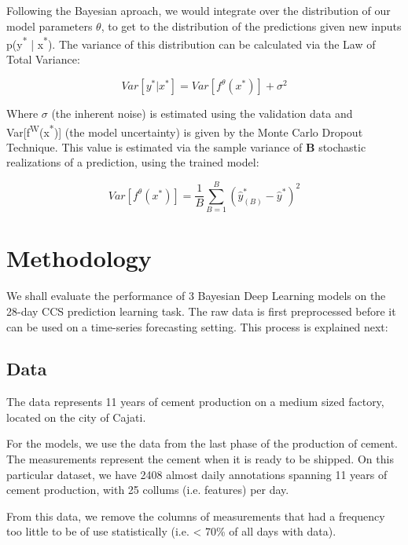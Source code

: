 \documentclass[a4paper]{article}
\begin{document}
Following the Bayesian aproach, we would integrate over the distribution of
our model parameters \(\theta\), to get to the distribution of the predictions given new inputs 
p(y\textsuperscript{*} | x\textsuperscript{*}). The variance of this distribution can be calculated via the Law of Total Variance:

\begin{equation}
Var[y^* | x^*] = Var[f^{\theta}(x^*)] + \sigma^2  
\end{equation}

Where \(\sigma\) (the inherent noise) is estimated using the validation data and Var[f\textsuperscript{W}(x\textsuperscript{*})] (the model uncertainty)
is given by the Monte Carlo Dropout Technique. This value is estimated via the sample variance 
of \textbf{\textbf{B}} stochastic realizations of a prediction, using the trained model: 

\begin{equation}
Var[f^{\theta}(x^*)]  = \frac{1}{B}\sum^B_{B=1}(\hat{y}^*_{(B)} - \hat{y}^*)^2  
\end{equation}

\section{Methodology}
\label{sec:orge452161}

We shall evaluate the performance of 3 Bayesian Deep Learning models on the 28-day CCS prediction learning task. The raw data is first preprocessed 
before it can be used on a time-series forecasting setting. This process is explained next:

\subsection{Data}
\label{sec:org75a0797}

The data represents 11 years of cement production on a medium sized factory, located on the city of Cajati.  

For the models, we use the data from the last phase of the production of cement. The measurements represent the cement when it is ready to be shipped. 
On this particular dataset, we have 2408 almost daily annotations spanning 11 years of cement production, with 25 collums (i.e. features) per day.

From this data, we remove the columns of measurements that had a frequency too little to be of use statistically (i.e. < 70\% of all days with data).
\end{document}

